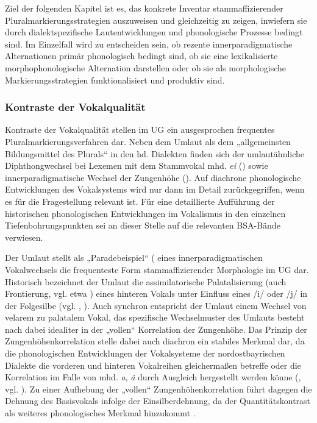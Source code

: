 Ziel der folgenden Kapitel ist es, das konkrete Inventar stammaffizierender Pluralmarkierungsstrategien auszuweisen und gleichzeitig zu zeigen, inwiefern sie durch dialektspezifische Lautentwicklungen und phonologische Prozesse bedingt sind. Im Einzelfall wird zu entscheiden sein, ob rezente innerparadigmatische Alternationen primär phonologisch bedingt sind, ob sie eine lexikalisierte morphophonologische Alternation darstellen oder ob sie als morphologische Markierungsstrategien funktionalisiert und produktiv sind.

\subsubsection{Kontraste der Vokalqualität}
\label{sec:7.1.2.1}
Kontraste der Vokalqualität stellen im UG ein ausgesprochen frequentes Pluralmarkierungsverfahren dar. Neben dem Umlaut als dem „allgemeinsten Bildungsmittel des Plurals“ \citep[1086]{Lüssy1983} in den hd. Dialekten finden sich der umlautähnliche Diphthongwechsel bei Lexemen mit dem Stammvokal mhd. \textit{ei} () sowie innerparadigmatische Wechsel der Zungenhöhe (). Auf diachrone phonologische Entwicklungen des Vokalsystems wird nur dann im Detail zurückgegriffen, wenn es für die Fragestellung relevant ist. Für eine detaillierte Aufführung der historischen phonologischen Entwicklungen im Vokalismus in den einzelnen Tiefenbohrungspunkten sei an dieser Stelle auf die relevanten BSA-Bände verwiesen.

\label{sec:7.1.2.1.1}
Der Umlaut stellt als „Paradebeispiel“ (\citet[57]{Rowley1997} eines innerparadigmatischen Vokalwechsels die frequenteste Form stammaffizierender Morphologie im UG dar. Historisch bezeichnet der Umlaut die assimilatorische Palatalisierung (auch Frontierung, vgl. etwa \citealt{Wiese1987}) eines hinteren Vokals unter Einfluss eines /i/ oder /j/ in der Folgesilbe (vgl. \citealt[194--199]{Schirmunski1962}, ). Auch synchron entspricht der Umlaut einem Wechsel von velarem zu palatalem Vokal, das spezifische Wechselmuster des Umlauts besteht nach \citet[57]{Rowley1997} dabei idealiter in der „vollen“ Korrelation der Zungenhöhe. Das Prinzip der Zungenhöhenkorrelation stelle dabei auch diachron ein stabiles Merkmal dar, da die phonologischen Entwicklungen der Vokalsysteme der nordostbayrischen Dialekte die vorderen und hinteren Vokalreihen gleichermaßen betreffe oder die Korrelation im Falle von mhd. \textit{a}, \textit{â} durch Ausgleich hergestellt werden könne (\citealt[57--66]{Rowley1997}, vgl. \citealt[47]{Steger1968}). Zu einer Aufhebung der „vollen“ Zungenhöhenkorrelation führt dagegen die Dehnung des Basisvokals infolge der Einsilberdehnung, da der Quantitätskontrast als weiteres phonologisches Merkmal hinzukommt \citep[67]{Rowley1997}.

